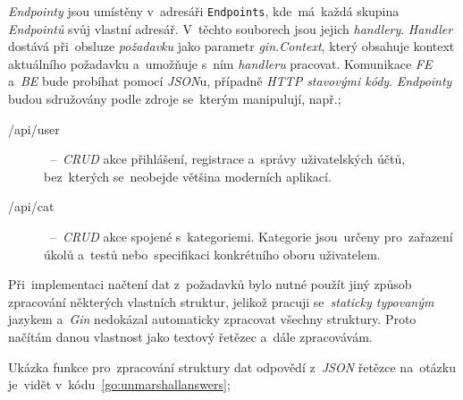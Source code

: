 \documentclass[11pt,a4paper]{report}
\let\oldacrshort\acrshort
\renewcommand{\acrshort}[1]{\emph{\normalsize\color[rgb]{0,0,0}\noindent\oldacrshort{#1}}}
\begin{document}
            \emph{Endpointy} jsou umístěny v~adresáři \texttt{Endpoints}, kde~má~každá skupina \emph{Endpointů} svůj vlastní adresář. V~těchto souborech jsou jejich \emph{handlery}. \emph{Handler} dostává při~obsluze \emph{požadavku} jako parametr \emph{gin.Context}, který obsahuje kontext aktuálního požadavku a~umožňuje s~ním \emph{handleru} pracovat. Komunikace \acrshort{FE} a~\acrshort{BE} bude probíhat pomocí \emph{JSON}u, případně \emph{HTTP stavovými kódy}. \emph{Endpointy} budou sdružovány podle zdroje se~kterým manipulují, např.;
            \begin{description}
                \item[/api/user]~--~\emph{CRUD} akce přihlášení, registrace a~správy uživatelských účtů, bez~kterých se~neobejde většina moderních aplikací.
                \item[/api/cat]~--~\emph{CRUD} akce spojené s~kategoriemi. Kategorie jsou~určeny pro~zařazení úkolů a~testů nebo~specifikaci konkrétního oboru uživatelem.
            \end{description}

            Při~implementaci načtení dat z~požadavků bylo nutné použít jiný způsob zpracování některých vlastních struktur, jelikož pracuji se~\emph{staticky typovaným} jazykem a~\emph{Gin} nedokázal automaticky zpracovat všechny struktury. Proto načítám danou vlastnost jako textový řetězec a~dále zpracovávám.
            
            Ukázka funkce pro~zpracování struktury dat odpovědí z~\emph{JSON} řetězce na~otázku je~vidět v~kódu~\ref{go:unmarshallanswers};
\end{document}
